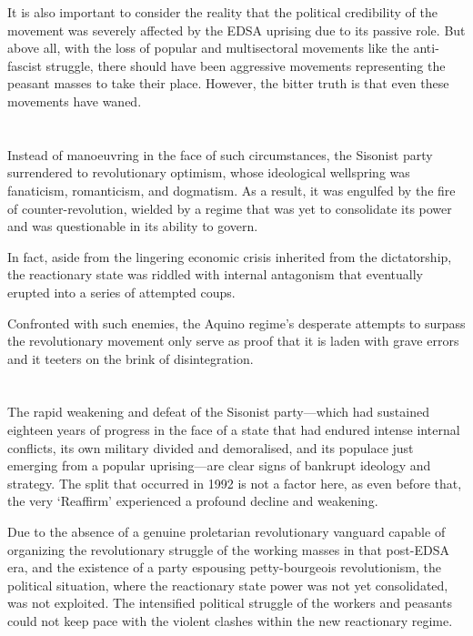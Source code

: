 It is also important to consider the reality 
that the political credibility of the movement 
was severely affected by the EDSA uprising 
due to its passive role. 
But above all, with the loss of popular and multisectoral movements 
like the anti-fascist struggle, 
there should have been aggressive movements representing the peasant masses 
to take their place. 
However, the bitter truth is that even these movements have waned.



\section{}
Instead of manoeuvring in the face of such circumstances,
the Sisonist party surrendered to revolutionary optimism, 
whose ideological wellspring was fanaticism, romanticism, and dogmatism. 
As a result, it was engulfed by the fire of counter-revolution, 
wielded by a regime that was yet to consolidate its power
and was questionable in its ability to govern.

In fact, 
aside from the lingering economic crisis inherited from the dictatorship, 
the reactionary state was riddled with internal antagonism 
that eventually erupted into a series of attempted coups.

Confronted with such enemies, 
the Aquino regime's desperate attempts 
to surpass the revolutionary movement only 
serve as proof that it is laden with grave errors 
and it teeters on the brink of disintegration.                    


\section{}
The rapid weakening and defeat of the Sisonist party---which 
had sustained eighteen years of progress
in the face of a state that had endured intense internal conflicts,
its own military divided and demoralised, 
and its populace just emerging from a popular uprising---are 
clear signs of bankrupt ideology and strategy.
The split that occurred in 1992 is not a factor here, 
as even before that, the very `Reaffirm' experienced 
a profound decline and weakening.

Due to the absence of a genuine proletarian revolutionary vanguard 
capable of organizing the revolutionary struggle of the working masses 
in that post-EDSA era, 
and the existence of a party espousing petty-bourgeois revolutionism, 
the political situation, where the reactionary state power was 
not yet consolidated, was not exploited. 
The intensified political struggle of the workers and peasants could not 
keep pace with the violent clashes within the new reactionary regime.

